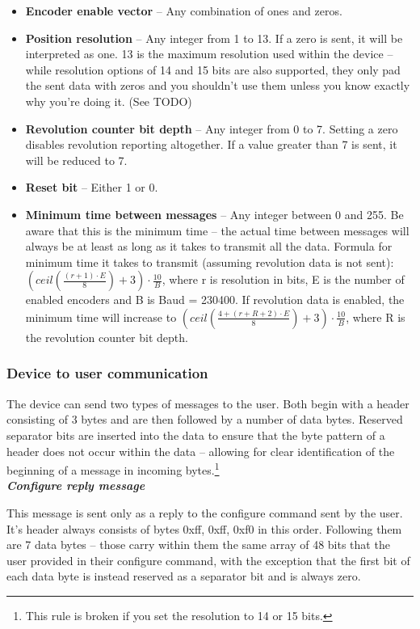 \documentclass[twoside]{article}
\begin{document}
\begin{itemize}
\item \textbf{Encoder enable vector} -- Any combination of ones and zeros.
\item \textbf{Position resolution} -- Any integer from 1 to 13. If a zero is sent, it will be interpreted as one. 13 is the maximum resolution used within the device -- while resolution options of 14 and 15 bits are also supported, they only pad the sent data with zeros and you shouldn't use them unless you know exactly why you're doing it. (See TODO)
\item \textbf{Revolution counter bit depth} -- Any integer from 0 to 7. Setting a zero disables revolution reporting altogether. If a value greater than 7 is sent, it will be reduced to 7.
\item \textbf{Reset bit} -- Either 1 or 0.
\item \textbf{Minimum time between messages} -- Any integer between 0 and 255. Be aware that this is the minimum time -- the actual time between messages will always be at least as long as it takes to transmit all the data. Formula for minimum time it takes to transmit (assuming revolution data is not sent): $(ceil(\frac{(r+1)\cdot{}E}{8}) + 3)\cdot{}\frac{10}{B}$, where r is resolution in bits, E is the number of enabled encoders and B is Baud = 230400. If revolution data is enabled, the minimum time will increase to  $(ceil(\frac{4+(r+R+2)\cdot{}E}{8}) + 3)\cdot{}\frac{10}{B}$, where R is the revolution counter bit depth.
\end{itemize}


\subsubsection{Device to user communication}

The device can send two types of messages to the user. Both begin with a header consisting of 3 bytes and are then followed by a number of data bytes. Reserved separator bits are inserted into the data to ensure that the byte pattern of a header does not occur within the data -- allowing for clear identification of the beginning of a message in incoming bytes.\footnote{This rule is broken if you set the resolution to 14 or 15 bits.} \\

\noindent\emph{\textbf{Configure reply message}}

This message is sent only as a reply to the configure command sent by the user. It's header always consists of bytes 0xff, 0xff, 0xf0 in this order. Following them are 7 data bytes -- those carry within them the same array of 48 bits that the user provided in their configure command, with the exception that the first bit of each data byte is instead reserved as a separator bit and is always zero.
\end{document}
